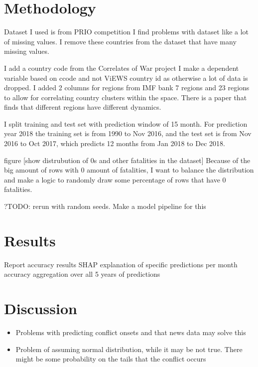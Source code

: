 \documentclass[runningheads]{llncs}
\begin{document}
    \section{Methodology}

    Dataset I used is from PRIO competition
    I find problems with dataset like a lot of missing values.
    I remove these countries from the dataset that have many missing values.

    I add a country code from the Correlates of War project
    I make a dependent variable based on ccode and not ViEWS country id as otherwise a lot of data is dropped.
    I added 2 columns for regions from IMF bank 7 regions and 23 regions to allow for correlating country clusters within the space. There is a paper that finds that different regions have different dynamics.

    I split training and test set with prediction window of 15 month. For prediction year 2018 the training set is from 1990 to Nov 2016, and the test set is from Nov 2016 to Oct 2017, which predicts 12 months from Jan 2018 to Dec 2018.

    figure [show distrubution of 0s and other fatalities in the dataset]
    Because of the big amount of rows with 0 amount of fatalities, I want to balance the distribution and make a logic to randomly draw some percentage of rows that have 0 fatalities.


    ?TODO: rerun with random seeds. Make a model pipeline for this


    \section{Results}

    Report accuracy results
    SHAP explanation of specific predictions
    per month accuracy aggregation over all 5 years of predictions


    \section{Discussion}

    \begin{itemize}
        \item Problems with predicting conflict onsets and that news data may solve this
        \item Problem of assuming normal distribution, while it may be not true. There might be some probability on the tails that the conflict occurs
    \end{itemize}
\end{document}
